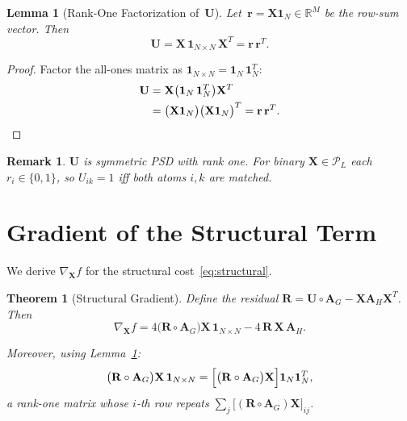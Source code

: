 \documentclass[conference]{IEEEtran}
\newtheorem{theorem}{Theorem}
\newtheorem{lemma}{Lemma}
\newtheorem{remark}{Remark}
\begin{document}
\begin{lemma}[Rank-One Factorization of~$\mathbf{U}$]
\label{lem:U-outer}
Let\, $\mathbf{r} = \mathbf{X}\mathbf{1}_N \!\in\! \mathbb{R}^{M}$ be the
row-sum vector. Then
\begin{equation}
\mathbf{U}
  = \mathbf{X}\,\mathbf{1}_{N \times N}\,\mathbf{X}^{T}
  = \mathbf{r}\,\mathbf{r}^{T}.
\label{eq:U-outer}
\end{equation}
\end{lemma}

\begin{proof}
Factor the all-ones matrix as
$\mathbf{1}_{N \times N} = \mathbf{1}_N\,\mathbf{1}_N^{T}$:
\begin{align}
\mathbf{U}
  &= \mathbf{X}\bigl(\mathbf{1}_N\,\mathbf{1}_N^{T}\bigr)\mathbf{X}^{T}
\notag\\
  &= \bigl(\mathbf{X}\mathbf{1}_N\bigr)
     \bigl(\mathbf{X}\mathbf{1}_N\bigr)^{T}
  = \mathbf{r}\,\mathbf{r}^{T}.\label{eq:U-proof}
\end{align}
\end{proof}

\begin{remark}
$\mathbf{U}$ is symmetric PSD with rank one.
For binary $\mathbf{X} \!\in\! \mathcal{P}_L$ each $r_i \!\in\! \{0,1\}$,
so $U_{ik} = 1$ iff both atoms $i,k$ are matched.
\end{remark}


\section{Gradient of the Structural Term}
\label{sec:gradient}

We derive $\nabla_{\!\mathbf{X}} f$ for the structural cost~\eqref{eq:structural}.

\begin{theorem}[Structural Gradient]
\label{thm:gradient}
Define the residual
$\mathbf{R} = \mathbf{U} \circ \mathbf{A}_G
              - \mathbf{X}\mathbf{A}_H\mathbf{X}^{T}$.
Then
\begin{equation}
\nabla_{\!\mathbf{X}} f
  = 4\bigl(\mathbf{R} \circ \mathbf{A}_G\bigr)
    \mathbf{X}\,\mathbf{1}_{N \times N}
  - 4\,\mathbf{R}\,\mathbf{X}\,\mathbf{A}_H.
\label{eq:gradient}
\end{equation}

Moreover, using Lemma~\ref{lem:U-outer}:
\begin{equation}
\bigl(\mathbf{R} \circ \mathbf{A}_G\bigr)
  \mathbf{X}\,\mathbf{1}_{N \times N}
= \Bigl[\bigl(\mathbf{R} \circ \mathbf{A}_G\bigr)\mathbf{X}\Bigr]
  \mathbf{1}_N\mathbf{1}_N^{T},
\label{eq:gradient-broadcast}
\end{equation}
a rank-one matrix whose $i$-th row repeats
$\sum_{j}\bigl[(\mathbf{R}\!\circ\!\mathbf{A}_G)\mathbf{X}\bigr]_{ij}$.
\end{theorem}
\end{document}
